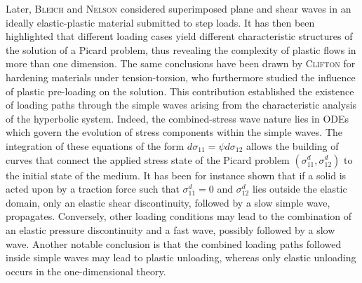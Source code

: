 Later, \textsc{Bleich} and \textsc{Nelson} \cite{Bleich} considered superimposed plane and shear waves in an ideally elastic-plastic material submitted to step loads.
It has then been highlighted that different loading cases yield different characteristic structures of the solution of a Picard problem, thus revealing the complexity of plastic flows in more than one dimension.
The same conclusions have been drawn by \textsc{Clifton} \cite{Clifton} for hardening materials under tension-torsion, who furthermore studied the influence of plastic pre-loading on the solution.
This contribution established the existence of loading paths through the simple waves arising from the characteristic analysis of the hyperbolic system.
Indeed, the combined-stress wave nature lies in ODEs which govern the evolution of stress components within the simple waves.
The integration of these equations of the form $d\sigma_{11}=\psi d\sigma_{12}$ allows the building of curves that connect the applied stress state of the Picard problem $(\sigma^d_{11},\sigma^d_{12})$ to the initial state of the medium.
It has been for instance shown that if a solid is acted upon by a traction force such that $\sigma^d_{11}=0$ and $\sigma^d_{12}$ lies outside the elastic domain, only an elastic shear discontinuity, followed by a slow simple wave, propagates.
Conversely, other loading conditions may lead to the combination of an elastic pressure discontinuity and a fast wave, possibly followed by a slow wave.
Another notable conclusion is that the combined loading paths followed inside simple waves may lead to plastic unloading, whereas only elastic unloading occurs in the one-dimensional theory.

